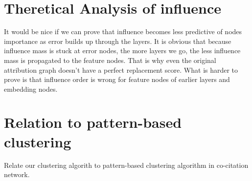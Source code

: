 \documentclass[../main.tex]{subfiles}
\begin{document}

\section{Theretical Analysis of influence}
It would be nice if we can prove that influence becomes less predictive of nodes importance as error builds up through the layers.
It is obvious that because influence mass is stuck at error nodes, the more layers we go, the less influence mass is propagated to the feature nodes. That is why even the original attribution graph doesn't have a perfect replacement score.
What is harder to prove is that influence order is wrong for feature nodes of earlier layers and embedding nodes.



\section{Relation to pattern-based clustering}
Relate our clustering algorith to pattern-based clustering algorithm in co-citation network.
\end{document}
